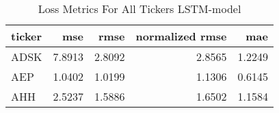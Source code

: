 \begin{table}
\caption{Loss Metrics For All Tickers LSTM-model}
\label{tab:loss_total_lstm}
\begin{tabular}{lrrrr}
\toprule
ticker & mse & rmse & normalized rmse & mae \\
\midrule
ADSK & 7.8913 & 2.8092 & 2.8565 & 1.2249 \\
AEP & 1.0402 & 1.0199 & 1.1306 & 0.6145 \\
AHH & 2.5237 & 1.5886 & 1.6502 & 1.1584 \\
\bottomrule
\end{tabular}
\end{table}
